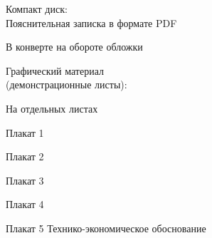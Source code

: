 


 
 
 
 
 \newpage
 \tableofcontents
 \vspace{1cm}
 \begin{minipage}[left]{0.6\linewidth}
  Компакт диск: \\
  Пояснительная записка в формате PDF
 \end{minipage}
 \hfill
 \begin{minipage}[right]{0.3\linewidth}
  В конверте на обороте обложки 
 \end{minipage}
 
 \vspace{1cm}
 
 \begin{minipage}[left]{0.6\linewidth}
  Графический материал \\ (демонстрационные листы):
 \end{minipage}
 \hfill
 \begin{minipage}[right]{0.3\linewidth}
  На отдельных листах
 \end{minipage}
 
 \vspace{1cm}
 
 Плакат 1
 
 Плакат 2
 
 Плакат 3
 
 Плакат 4
 
 Плакат 5 Технико-экономическое обоснование
 
 
 
 
 
 
 \newpage
 \renewcommand{\refname}{\hfill Список использованных источников \hfill}
 


